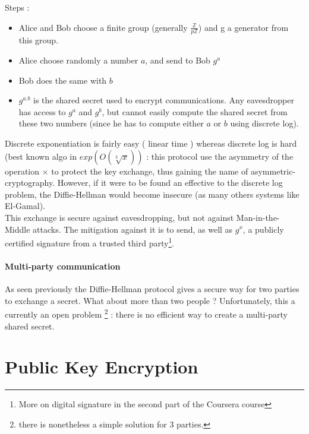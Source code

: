 Steps : 
\begin{itemize}
	\item Alice and Bob choose a finite group (generally $\frac{\mathbb{Z}}{p\mathbb{Z}}$) and g a generator from this group. 
	\item Alice choose randomly a number $a$, and send to Bob $g^a$
	\item Bob does the same with $b$
	\item $g^{a.b}$ is the shared secret used to encrypt communications. Any eavesdropper has access to $g^{a}$ and $g^{b}$, but cannot easily compute the shared secret from these two numbers (since he has to compute either $a$ or $b$ using discrete log).
\end{itemize}

Discrete exponentiation is fairly easy ( linear time ) whereas discrete log is hard (best known algo in $exp(O(\sqrt[3]{x}))$ : this protocol use the asymmetry of the operation $\times $ to protect the key exchange, thus gaining the name of asymmetric-cryptography. However, if it were to be found an effective to the discrete log problem, the Diffie-Hellman would become insecure (as many others systems like El-Gamal).\\

This exchange is secure against eavesdropping, but not against Man-in-the-Middle attacks. The mitigation against it is to send, as well as $g^x$, a publicly certified signature from a trusted third party\footnote{More on digital signature in the second part of the Coursera course}.\\

\paragraph{Multi-party communication}
As seen previously the Diffie-Hellman protocol gives a secure way for two parties to exchange a secret. What about more than two people ? Unfortunately, this a currently an open problem \footnote{there is nonetheless a simple solution for 3 parties.} : there is no efficient way to create a multi-party shared secret.


\section{Public Key Encryption}


